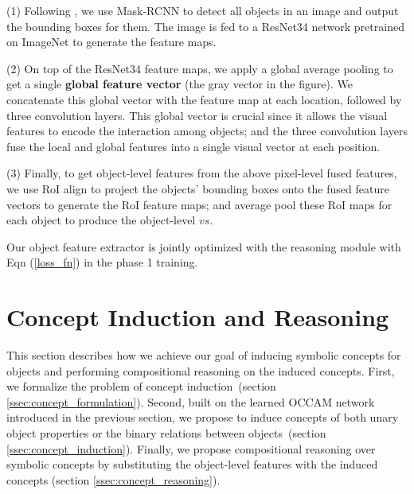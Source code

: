 \documentclass[10pt,twocolumn,letterpaper]{article}
\begin{document}
(1) Following \cite{mao2018neuro}, we use Mask-RCNN \cite{he2017mask} to detect all objects in an image and output the bounding boxes for them. 
The image is fed to a ResNet34 network \cite{He_2016_CVPR} pretrained on ImageNet \cite{deng2009imagenet} to generate the feature maps.





(2) On top of the ResNet34 feature maps, we apply a global average pooling to get a single \textbf{global feature vector} (the gray vector in the figure). We concatenate this global vector with the feature map at each location, followed by {three convolution layers}.
This global vector is crucial since it allows the visual features to encode the interaction among objects; and the three convolution layers {fuse} the local and global features into a single visual vector at each position.

(3) Finally, to get object-level features from the above pixel-level fused features, we use RoI align \cite{he2017mask} to project the objects' bounding boxes onto the fused feature vectors to generate the RoI feature maps; and average pool these RoI maps for each object to produce the object-level $vs$.

Our object feature extractor is jointly optimized with the reasoning module with Eqn (\ref{loss_fn}) in the phase 1 training.

\vspace{-3mm}
\section{Concept Induction and Reasoning}
\vspace{-2mm}
\label{sec:concept_induction}

This section describes how we achieve our goal of inducing symbolic concepts for objects and performing compositional reasoning on the induced concepts. 
First, we formalize the problem of concept induction~(section \ref{ssec:concept_formulation}).
Second, built on the learned OCCAM network introduced in the previous section, we propose to induce concepts of both unary object properties or the binary relations between objects~(section \ref{ssec:concept_induction}). Finally, we propose compositional reasoning over symbolic concepts by substituting the object-level features with the induced concepts (section \ref{ssec:concept_reasoning}). 

\vspace{-2mm}
\end{document}
